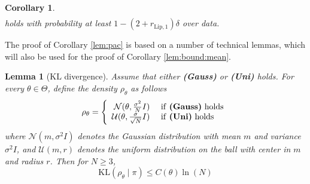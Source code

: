 \documentclass{article}
\def\rve{{\mathbf{e}}}
\newcommand{\KL}{\mathrm{KL}}
\renewcommand{\KL}{\mathrm{KL}}
\newtheorem{lemma}[theorem]{Lemma}
\newtheorem{corollary}[theorem]{Corollary}
\newcommand{\e}{\mathbf{e}}
\begin{document}
\begin{corollary}
\begin{equation}
\begin{aligned}
    \end{aligned}
   \end{equation}
    holds with probability at least $1-(2+r_{\text{Lip},1})\delta$ over data.
 \end{corollary}
The proof of Corollary \ref{lem:pac} is based on a number of technical lemmas, which will also be used for
the proof of Corollary \ref{lem:bound:mean}.
\begin{lemma}[$\KL$ divergence]
  \label{pac:kl}
   Assume that either \textbf{(Gauss)} or \textbf{(Uni)} holds.
   For every $\theta \in \Theta$, define the density $\rho_{\theta}$ as follows
  \[ \rho_{\theta}=\left\{ \begin{array}{rl}
                           \mathcal{N}(\theta,\frac{\sigma^2}{N}I) & \mbox{ if \textbf{(Gauss)} holds} \\
                            \mathcal{U}(\theta,\frac{\sigma}{\sqrt{N}}I)  & \mbox{ if \textbf{(Uni)} holds}
                         \end{array} \right. 
  \]
   where $\mathcal{N}(m,\sigma^2I)$ denotes the Gaussian distribution with mean $m$ and variance $\sigma^2I$, and
   $\mathcal{U}(m,r)$ denotes the uniform  distribution on the ball with center in $m$ and radius $r$.
  Then for $N \ge 3$,
  \[ \KL(\rho_{\theta} \mid \pi) \le C(\theta)\ln(N)\]
\end{lemma}
\end{document}
